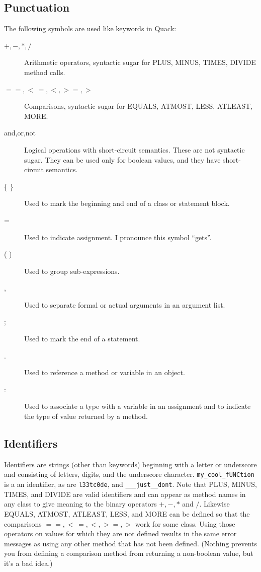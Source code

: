 \documentclass[11pt]{article}
\begin{document}
\subsection{Punctuation}

The following symbols are used like keywords in Quack: 
\begin{description}
\item[$+,-,*,/$]  Arithmetic operators, syntactic sugar for PLUS, MINUS,
  TIMES, DIVIDE method calls. 
\item[$==,  <\,=, <, >=, >$] Comparisons, syntactic sugar for 
   EQUALS, ATMOST, LESS, ATLEAST, MORE. 
\item[and,or,not]  Logical operations with short-circuit semantics. 
   These are not syntactic sugar.  They can be used only for boolean 
   values, and they have short-circuit semantics. 
\item[\{ \}] Used to mark the beginning and end of a class 
   or statement block. 
\item[=] Used to indicate assignment.  I pronounce this symbol
  ``gets''. 
\item[( )] Used to group sub-expressions. 
\item[,] Used to separate formal or actual arguments in an argument
  list.
\item[;] Used to mark the end of a statement. 
\item[.]  Used to reference a method or variable in an object. 
\item[:] Used to associate a type with a variable in an assignment
    and to indicate the type of value returned by a method. 
\end{description}


\subsection{Identifiers}

Identifiers are strings (other than keywords) beginning with a letter
or underscore and consisting of letters,
digits, and the underscore character.  \verb|my_cool_fUNCtion|  is a  
an identifier, as are \verb|l33tc0de|, and \verb|___just__dont|.  Note
that PLUS, MINUS, TIMES, and DIVIDE are valid identifiers and can
appear as method names in any class to give meaning to the binary
operators \(+, -, *\) and \(/\).  Likewise EQUALS, ATMOST, ATLEAST, 
LESS, and MORE can be defined so that the comparisons 
\(== , <\,=, <, >=, > \) work for some class. 
Using those operators on values for
which they are not defined results in the same error messages as using
any other method that has not been defined.  (Nothing prevents you
from defining a comparison method from returning a non-boolean value,
but it's a bad idea.) 
\end{document}
